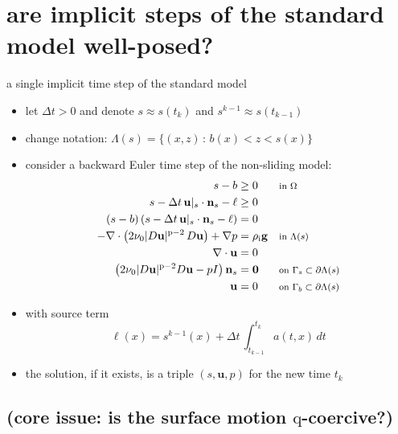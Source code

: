 \documentclass[10pt,svgnames]{beamer}
\newcommand{\bg}{\mathbf{g}}
\newcommand{\bn}{\mathbf{n}}
\newcommand{\bu}{\mathbf{u}}
\newcommand{\bzero}{\bm{0}}
\newcommand{\pp}{\mathrm{p}}
\newcommand{\qq}{\mathrm{q}}
\newcommand{\rhoi}{\rho_{\text{i}}}
\newcommand{\where}[1]{\text{\footnotesize #1}}
\newcommand{\aler}[1]{{\color{FireBrick} #1}}
\begin{document}
\section{are implicit steps of the standard model well-posed?}

\begin{frame}{a single implicit time step of the standard model}

\begin{itemize}
\item let $\Delta t>0$ and denote \aler{$s \approx s(t_k)$} and $s^{k-1}\approx s(t_{k-1})$
\item change notation: \aler{$\Lambda(s) = \{(x,z)\,:\,b(x) < z < s(x)\}$}
\item consider a \aler{backward Euler time step} of the non-sliding model:
{\small
\begin{align*}
s - b &\ge 0 & &\where{in $\Omega$} \\
s - \Delta t\, \bu|_s \cdot \bn_s - \ell &\ge 0 \\
(s - b) \left(s - \Delta t\, \bu|_s \cdot \bn_s - \ell\right) &= 0 \\
- \nabla \cdot \left(2 \nu_0 |D\bu|^{\pp-2}\, D\bu\right) + \nabla p &= \rhoi \bg && \where{in $\Lambda(s)$} \\
\nabla \cdot \bu &= 0 \\
\left(2 \nu_0 |D\bu|^{\pp-2} D\bu - pI\right) \bn_s &= \bzero && \where{on $\Gamma_s \subset \partial\Lambda(s)$} \\
\bu &= 0 && \where{on $\Gamma_b \subset \partial\Lambda(s)$}
\end{align*}
}
\item with source term
{\small
    $$\ell(x) = s^{k-1}(x) + \Delta t\,\int_{t_{k-1}}^{t_k} a(t,x)\,dt$$
}
\item the solution, if it exists, is a triple $(s,\bu,p)$ for the new time $t_k$
\end{itemize}
\end{frame}


\subsection{(core issue: is the surface motion $\qq$-coercive?)}
\end{document}
